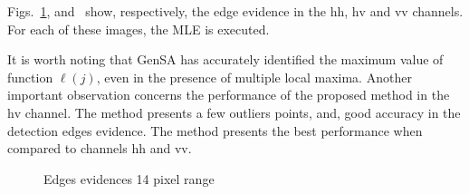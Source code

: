 \documentclass[journal]{IEEEtran}
\begin{document}
Figs.~\ref{evidencias_hh_hv_vv},  and~ show, respectively, the edge evidence in the $\text{hh}$, $\text{hv}$ and $\text{vv}$ channels. For each of these images, the MLE is executed.

It is worth noting that GenSA has accurately identified the maximum value of function $\ell(j)$, even in the presence of multiple local maxima. Another important observation concerns the performance of the proposed method in the $\text{hv}$ channel. The method presents a few outliers points, and, good accuracy in the detection edges evidence. The method presents the best performance when compared to channels $\text{hh}$ and $\text{vv}$. 
   \begin{figure}[hbt]
	\centering
     \caption{Edges evidences 14 pixel range}
     \label{evidencias_hh_hv_vv} 
   \end{figure}
\end{document}
